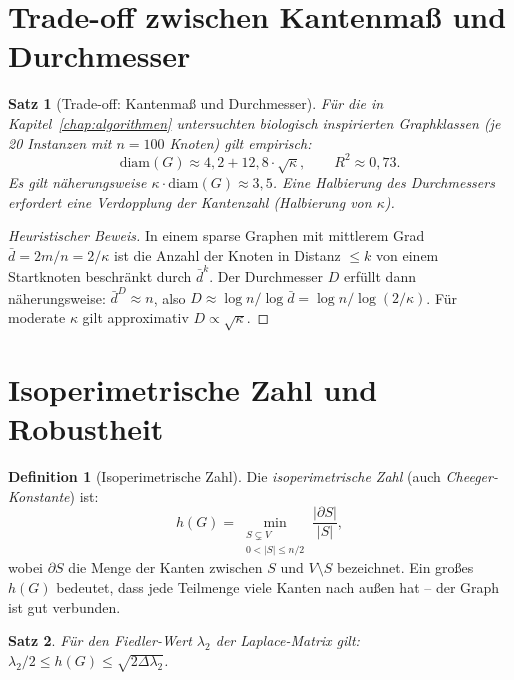 ﻿\documentclass[a4paper,12pt,openany,oneside]{book}
\theoremstyle{definition}
\newtheorem{definition}{Definition}[chapter]
\theoremstyle{plain}
\newtheorem{satz}{Satz}[chapter]
\theoremstyle{remark}
\begin{document}
\section{Trade-off zwischen Kantenma\ss{} und Durchmesser}

\begin{satz}[Trade-off: Kantenma\ss{} und Durchmesser]
  \label{satz:tradeoff}
  F\"ur die in Kapitel~\ref{chap:algorithmen} untersuchten biologisch
  inspirierten Graphklassen (je 20 Instanzen mit $n = 100$ Knoten) gilt
  empirisch:
  \[
    \mathrm{diam}(G) \approx 4{,}2 + 12{,}8 \cdot \sqrt{\kappa},
    \qquad R^2 \approx 0{,}73.
  \]
  Es gilt n\"aherungsweise $\kappa \cdot \mathrm{diam}(G) \approx 3{,}5$.
  Eine Halbierung des Durchmessers erfordert eine Verdopplung der
  Kantenzahl (Halbierung von $\kappa$).
\end{satz}

\begin{proof}[Heuristischer Beweis]
  In einem sparse Graphen mit mittlerem Grad $\bar{d} = 2m/n = 2/\kappa$ ist
  die Anzahl der Knoten in Distanz $\leq k$ von einem Startknoten beschr\"ankt
  durch $\bar{d}^k$. Der Durchmesser $D$ erf\"ullt dann n\"aherungsweise:
  $\bar{d}^D \approx n$, also
  $D \approx \log n / \log \bar{d} = \log n / \log(2/\kappa)$.
  F\"ur moderate $\kappa$ gilt approximativ $D \propto \sqrt{\kappa}$.
\end{proof}

\section{Isoperimetrische Zahl und Robustheit}

\begin{definition}[Isoperimetrische Zahl]
  Die \emph{isoperimetrische Zahl} (auch \emph{Cheeger-Konstante}) ist:
  \[
    h(G) = \min_{\substack{S \subsetneq V \\ 0 < |S| \leq n/2}}
           \frac{|\partial S|}{|S|},
  \]
  wobei $\partial S$ die Menge der Kanten zwischen $S$ und $V \setminus S$
  bezeichnet. Ein gro\ss{}es $h(G)$ bedeutet, dass jede Teilmenge viele
  Kanten nach au\ss{}en hat -- der Graph ist gut verbunden.
\end{definition}

\begin{satz}
  F\"ur den Fiedler-Wert $\lambda_2$ der Laplace-Matrix gilt:
  $\lambda_2 / 2 \leq h(G) \leq \sqrt{2 \Delta \lambda_2}$.
\end{satz}
\end{document}
